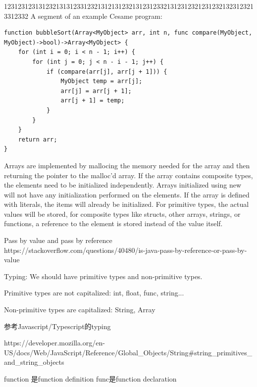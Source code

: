 \documentclass[11pt,A4]{article}
\begin{document}
1231231231312321313123312321312131232131231233213123123212312321323123213312332
A segment of an example Cesame program:
\begin{lstlisting}[caption={bubbleSort.csm}, captionpos=b]
function bubbleSort(Array<MyObject> arr, int n, func compare(MyObject, MyObject)->bool)->Array<MyObject> {
    for (int i = 0; i < n - 1; i++) {
        for (int j = 0; j < n - i - 1; j++) {
            if (compare(arr[j], arr[j + 1])) {
                MyObject temp = arr[j];
                arr[j] = arr[j + 1];
                arr[j + 1] = temp;
            }
        }
    }
    return arr;
}
\end{lstlisting}


Arrays are implemented by mallocing the memory needed for the array and then returning
the pointer to the malloc’d array.
If the array contains composite types, the elements need to be initialized independently. Arrays
initialized using new will not have any initialization performed on the elements. If the array is
defined with literals, the items will already be initialized. For primitive types, the actual values
will be stored, for composite types like structs, other arrays, strings, or functions, a reference
to the element is stored instead of the value itself.

Pass by value and pass by reference
https://stackoverflow.com/questions/40480/is-java-pass-by-reference-or-pass-by-value

Typing:
We should have primitive types and non-primitive types.

Primitive types are not capitalized: int, float, func, string...

Non-primitive types are capitalized: String, Array

参考Javascript/Typescript的typing

https://developer.mozilla.org/en-US/docs/Web/JavaScript/Reference/Global_Objects/String#string_primitives_and_string_objects

function 是function definition
func是function declaration
    
\end{document}
